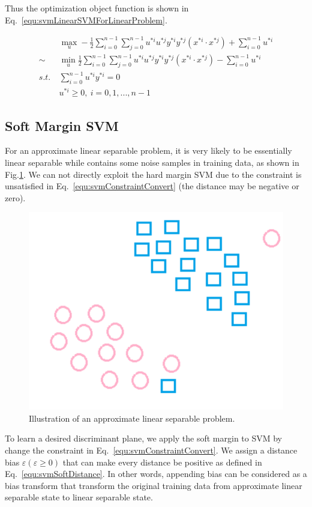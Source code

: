\documentclass[runningheads,openany]{xhlPaper}
\begin{document}
Thus the optimization object function is shown in Eq.~\ref{equ:svmLinearSVMForLinearProblem}.
   
\begin{equation}
\label{equ:svmLinearSVMForLinearProblem}
\begin{aligned}
&\mathop {\max }\limits_u  - \frac{1}{2}\sum\limits_{i = 0}^{n - 1} {\sum\limits_{j = 0}^{n - 1} {{u^{*i}}{u^{*j}}{y^{*i}}{y^{*j}}\left( {{x^{*i}} \cdot {x^{*j}}} \right)} }  + \sum\limits_{i = 0}^{n - 1} {{u^{*i}}} \\
 \sim &\mathop {\min }\limits_u \frac{1}{2}\sum\limits_{i = 0}^{n - 1} {\sum\limits_{j = 0}^{n - 1} {{u^{*i}}{u^{*j}}{y^{*i}}{y^{*j}}\left( {{x^{*i}} \cdot {x^{*j}}} \right)} }  - \sum\limits_{i = 0}^{n - 1} {{u^{*i}}} \\
s.t.\ &\sum\limits_{i = 0}^{n - 1} {{u^{*i}}{y^{*i}}}  = 0\\
&{u^{*i}} \ge 0,\ i = 0,1,...,n - 1
\end{aligned}
\end{equation}

\subsection{Soft Margin SVM}
For an approximate linear separable problem, it is very likely to be essentially linear separable while contains some noise samples in training data, as shown in Fig.\ref{fig:svmNoiseSamplesInApproximateLinear}. We can not directly exploit the hard margin SVM due to the constraint is unsatisfied in Eq.~\ref{equ:svmConstraintConvert} (the distance may be negative or zero).

\begin{figure}
\centering
\includegraphics[width=0.5\linewidth]{svmNoiseSamplesInApproximateLinear}
\caption{Illustration of an approximate linear separable problem.}
\label{fig:svmNoiseSamplesInApproximateLinear}
\end{figure}

To learn a desired discriminant plane, we apply the soft margin to SVM by change the constraint in Eq.~\ref{equ:svmConstraintConvert}. We assign a distance bias $\varepsilon \left(\varepsilon \ge 0\right)$ that can make every distance be positive as defined in Eq.~\ref{equ:svmSoftDistance}. In other words, appending bias can be considered as a bias transform that transform the original training data from approximate linear separable state to linear separable state. 
\end{document}
